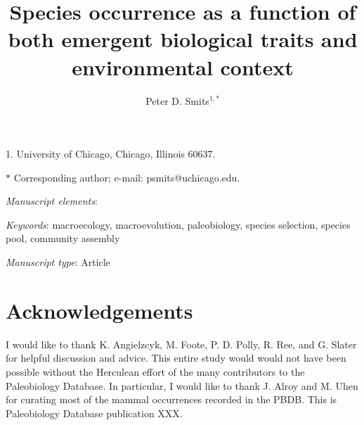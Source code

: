 \documentclass[11pt]{article}
\title{Species occurrence as a function of both emergent biological traits and environmental context}
\author{Peter D. Smits$^{1, \ast}$\\}
\date{}
\begin{document}
\maketitle

\noindent{}1. University of Chicago, Chicago, Illinois 60637.

\noindent{}$\ast$ Corresponding author; e-mail: psmits@uchicago.edu.

\bigskip

\textit{Manuscript elements}:

\bigskip

\textit{Keywords}: macroecology, macroevolution, paleobiology, species selection, species pool, community assembly

\bigskip

\textit{Manuscript type}: Article

\bigskip


\linenumbers
\modulolinenumbers[2]

\newpage{}












\section*{Acknowledgements}
I would like to thank K. Angielzcyk, M. Foote, P. D. Polly, R. Ree, and G. Slater for helpful discussion and advice. This entire study would would not have been possible without the Herculean effort of the many contributors to the Paleobiology Database. In particular, I would like to thank J. Alroy and M. Uhen for curating most of the mammal occurrences recorded in the PBDB. This is Paleobiology Database publication XXX.




\end{document}
